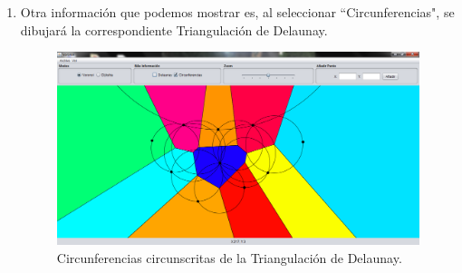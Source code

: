 \begin{enumerate}
        \item Otra información que podemos mostrar es, al seleccionar ``Circunferencias", se dibujará la correspondiente Triangulación de Delaunay.   
        \begin{figure}  [H]
            \centering
            \includegraphics[scale=0.3]{imagenes/circunferencias.png}
            \caption{Circunferencias circunscritas de la Triangulación de Delaunay.}
        \end{figure}
             

\end{enumerate}
